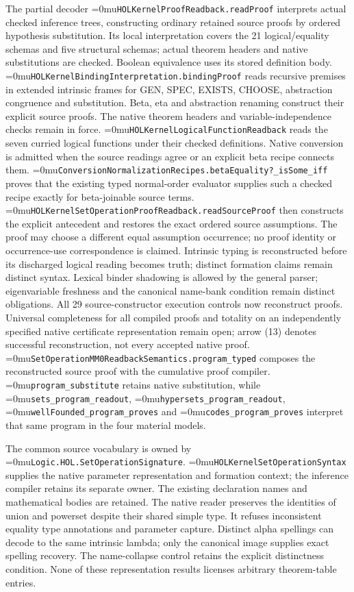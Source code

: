 \documentclass[11pt]{article}
\newcommand{\leanname}[1]{\textup{\Urlmuskip=0mu\relax\nolinkurl{#1}}}
\theoremstyle{definition}
\theoremstyle{remark}
\begin{document}
\begin{enumerate}[leftmargin=*]
  The partial decoder \leanname{HOLKernelProofReadback.readProof}
  interprets actual checked inference trees, constructing ordinary
  retained source proofs by ordered hypothesis substitution. Its local
  interpretation covers the 21 logical/equality schemas and five structural
  schemas; actual theorem headers and native substitutions are checked.
  Boolean equivalence uses its stored definition body.
  \leanname{HOLKernelBindingInterpretation.bindingProof} reads recursive
  premises in extended intrinsic frames for GEN, SPEC, EXISTS, CHOOSE,
  abstraction congruence and substitution. Beta, eta and abstraction renaming
  construct their explicit source proofs. The native theorem headers and
  variable-independence checks remain in force.
  \leanname{HOLKernelLogicalFunctionReadback} reads the seven curried logical
  functions under their checked definitions. Native conversion is admitted
  when the source readings agree or an explicit beta recipe connects them.
  \leanname{ConversionNormalizationRecipes.betaEquality?_isSome_iff} proves
  that the existing typed normal-order evaluator supplies such a checked
  recipe exactly for beta-joinable source terms.
  \leanname{HOLKernelSetOperationProofReadback.readSourceProof} then constructs
  the explicit antecedent and restores the exact ordered source assumptions.
  The proof may choose a different equal assumption occurrence; no proof
  identity or occurrence-use correspondence is claimed.
  Intrinsic typing is reconstructed before its discharged logical reading
  becomes truth; distinct formation claims remain distinct syntax.
  Lexical binder shadowing is allowed by the general parser; eigenvariable
  freshness and the canonical name-bank condition remain distinct obligations.
  All 29 source-constructor execution controls now reconstruct proofs.
  Universal completeness for all compiled proofs and totality on an
  independently specified native certificate representation remain open;
  arrow (13) denotes successful reconstruction, not every accepted native proof.
  \leanname{SetOperationMM0ReadbackSemantics.program_typed} composes the
  reconstructed source proof with the cumulative proof compiler.
  \leanname{program_substitute} retains native substitution, while
  \leanname{sets_program_readout}, \leanname{hypersets_program_readout},
  \leanname{wellFounded_program_proves} and \leanname{codes_program_proves}
  interpret that same program in the four material models.
\end{enumerate}

The common source vocabulary is owned by \leanname{Logic.HOL.SetOperationSignature}.
\leanname{HOLKernelSetOperationSyntax} supplies the native parameter representation
and formation context; the inference compiler retains its separate owner.
The existing declaration names and mathematical bodies are retained.
The native reader preserves the identities of union and powerset despite their
shared simple type. It refuses inconsistent equality type annotations and
parameter capture. Distinct alpha spellings can decode to the same intrinsic
lambda; only the canonical image supplies exact spelling recovery.
The name-collapse control retains the explicit distinctness condition.
None of these representation results licenses arbitrary theorem-table entries.
\end{document}
